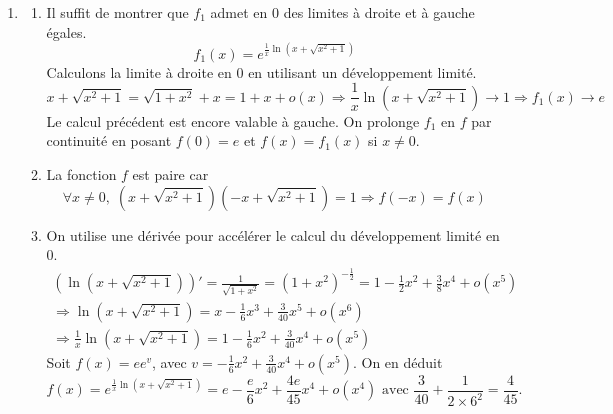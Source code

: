 \begin{enumerate}
  \item 
  \begin{enumerate}
    \item Il suffit de montrer que $f_{1}$ admet en 0 des limites {\`a} droite et {\`a} gauche {\'e}gales. 
\begin{displaymath}
f_{1}(x)=e^{\frac{1}{x}\ln (x+\sqrt{x^{2}+1})}  
\end{displaymath}
Calculons la limite {\`a} droite en 0 en utilisant un développement limité.
\begin{displaymath}
  x+\sqrt{x^{2}+1} = \sqrt{1+x^{2}} + x = 1 + x + o(x) \Rightarrow \frac{1}{x}\ln (x+\sqrt{x^{2}+1})\rightarrow 1
  \Rightarrow f_{1}(x)\rightarrow e
\end{displaymath}
Le calcul pr{\'e}c{\'e}dent est encore valable {\`a} gauche. On prolonge $f_1$ en $f$ par continuit{\'e} en posant $f(0)=e$ et $f(x)=f_1(x)$ si $x\neq 0$.

  \item La fonction $f$ est paire car
\begin{displaymath}
\forall x\neq 0, \; (x+\sqrt{x^{2}+1})(-x+\sqrt{x^{2}+1})=1 \Rightarrow f(-x) = f(x)  
\end{displaymath}

  \item On utilise une dérivée pour accélérer le calcul du d{\'e}veloppement limit{\'e} en 0.
\begin{multline*}
  \left( \ln(x+\sqrt{x^{2}+1})\right)' = \frac{1}{\sqrt{1+x^2}} =  \left( 1+x^2\right)^{-\frac{1}{2}}
  = 1-\frac{1}{2}x^2 + \frac{3}{8}x^4 +o(x^5) \\
  \Rightarrow \ln (x+\sqrt{x^{2}+1}) = x-\frac{1}{6}x^{3}+\frac{3}{40}x^{5}+o\left(x^{6}\right)  \\
\Rightarrow \frac{1}{x}\ln (x+\sqrt{x^{2}+1}) = 1-\frac{1}{6}x^{2}+\frac{3}{40}x^{4}+o\left( x^{5}\right)
\end{multline*}
Soit $f(x)=ee^{v}$, avec $v = -\frac{1}{6}x^{2}+\frac{3}{40}x^{4}+o\left( x^{5}\right) $. On en déduit
\begin{displaymath}
  f(x) = e^{\frac{1}{x}\ln (x+\sqrt{x^{2}+1})} = e  -\frac{e}{6} x^{2} + \frac{4e}{45} x^{4}+o\left( x^{4}\right) \text{ avec }\frac{3}{40} + \frac{1}{2\times 6^2} = \frac{4}{45}.
\end{displaymath}


\end{enumerate}
\end{enumerate}
